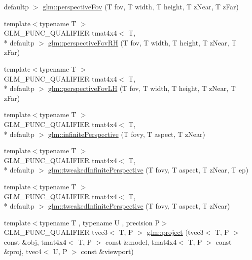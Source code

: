 \begin{DoxyCompactItemize}
defaultp $>$ \hyperlink{group__gtc__matrix__transform_gae9146e2c550fc8646299e4b900238145}{glm\-::perspective\-Fov} (T fov, T width, T height, T z\-Near, T z\-Far)
\item 
{\footnotesize template$<$typename T $>$ }\\G\-L\-M\-\_\-\-F\-U\-N\-C\-\_\-\-Q\-U\-A\-L\-I\-F\-I\-E\-R tmat4x4$<$ T, \\*
defaultp $>$ \hyperlink{group__gtc__matrix__transform_ga07cd8df791bf90dcb782645fe0b21261}{glm\-::perspective\-Fov\-R\-H} (T fov, T width, T height, T z\-Near, T z\-Far)
\item 
{\footnotesize template$<$typename T $>$ }\\G\-L\-M\-\_\-\-F\-U\-N\-C\-\_\-\-Q\-U\-A\-L\-I\-F\-I\-E\-R tmat4x4$<$ T, \\*
defaultp $>$ \hyperlink{group__gtc__matrix__transform_gae705a2f19c3ef5ef880bd6c92759cf2d}{glm\-::perspective\-Fov\-L\-H} (T fov, T width, T height, T z\-Near, T z\-Far)
\item 
{\footnotesize template$<$typename T $>$ }\\G\-L\-M\-\_\-\-F\-U\-N\-C\-\_\-\-Q\-U\-A\-L\-I\-F\-I\-E\-R tmat4x4$<$ T, \\*
defaultp $>$ \hyperlink{group__gtc__matrix__transform_ga79f704ad91a5f0d68abd88c66c8186e5}{glm\-::infinite\-Perspective} (T fovy, T aspect, T z\-Near)
\item 
{\footnotesize template$<$typename T $>$ }\\G\-L\-M\-\_\-\-F\-U\-N\-C\-\_\-\-Q\-U\-A\-L\-I\-F\-I\-E\-R tmat4x4$<$ T, \\*
defaultp $>$ \hyperlink{group__gtc__matrix__transform_gaa50fce7f50b5d5da881ed30f5532a921}{glm\-::tweaked\-Infinite\-Perspective} (T fovy, T aspect, T z\-Near, T ep)
\item 
{\footnotesize template$<$typename T $>$ }\\G\-L\-M\-\_\-\-F\-U\-N\-C\-\_\-\-Q\-U\-A\-L\-I\-F\-I\-E\-R tmat4x4$<$ T, \\*
defaultp $>$ \hyperlink{group__gtc__matrix__transform_gaed64bd81f5ecdab52fecbdf7f6b58194}{glm\-::tweaked\-Infinite\-Perspective} (T fovy, T aspect, T z\-Near)
\item 
{\footnotesize template$<$typename T , typename U , precision P$>$ }\\G\-L\-M\-\_\-\-F\-U\-N\-C\-\_\-\-Q\-U\-A\-L\-I\-F\-I\-E\-R tvec3$<$ T, P $>$ \hyperlink{group__gtc__matrix__transform_gad743556abd138264d4f06f4ca27f1d7e}{glm\-::project} (tvec3$<$ T, P $>$ const \&obj, tmat4x4$<$ T, P $>$ const \&model, tmat4x4$<$ T, P $>$ const \&proj, tvec4$<$ U, P $>$ const \&viewport)

\end{DoxyCompactItemize}
